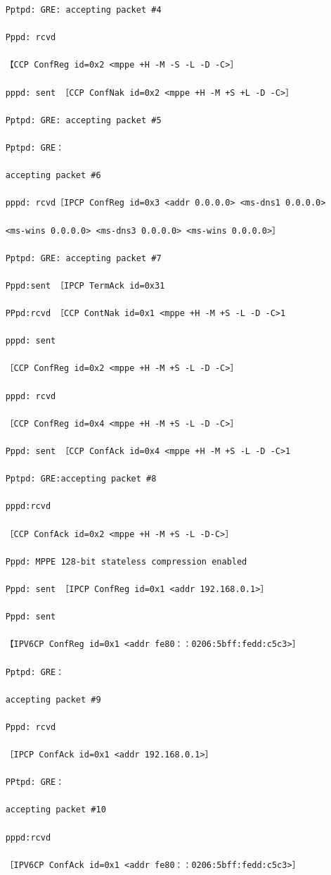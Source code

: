 \begin{verbatim}
    Pptpd: GRE: accepting packet #4
    
    Pppd: rcvd
    
    【CCP ConfReg id=0x2 <mppe +H -M -S -L -D -C>］
    
    pppd: sent ［CCP ConfNak id=0x2 <mppe +H -M +S +L -D -C>］
    
    Pptpd: GRE: accepting packet #5
    
    Pptpd: GRE：
    
    accepting packet #6
    
    pppd: rcvd［IPCP ConfReg id=0x3 <addr 0.0.0.0> <ms-dns1 0.0.0.0>
    
    <ms-wins 0.0.0.0> <ms-dns3 0.0.0.0> <ms-wins 0.0.0.0>］
    
    Pptpd: GRE: accepting packet #7
    
    Pppd:sent ［IPCP TermAck id=0x31
    
    PPpd:rcvd ［CCP ContNak id=0x1 <mppe +H -M +S -L -D -C>1
    
    pppd: sent
    
    ［CCP ConfReg id=0x2 <mppe +H -M +S -L -D -C>］
    
    pppd: rcvd
    
    ［CCP ConfReg id=0x4 <mppe +H -M +S -L -D -C>］
    
    Pppd: sent ［CCP ConfAck id=0x4 <mppe +H -M +S -L -D -C>1
    
    Pptpd: GRE:accepting packet #8
    
    pppd:rcvd
    
    ［CCP ConfAck id=0x2 <mppe +H -M +S -L -D-C>］
    
    Pppd: MPPE 128-bit stateless compression enabled
    
    Pppd: sent ［IPCP ConfReg id=0x1 <addr 192.168.0.1>］
    
    Pppd: sent
    
    【IPV6CP ConfReg id=0x1 <addr fe80：：0206:5bff:fedd:c5c3>］
    
    Pptpd: GRE：
    
    accepting packet #9
    
    Pppd: rcvd
    
    ［IPCP ConfAck id=0x1 <addr 192.168.0.1>］
    
    PPtpd: GRE：
    
    accepting packet #10
    
    pppd:rcvd
    
    ［IPV6CP ConfAck id=0x1 <addr fe80：：0206:5bff:fedd:c5c3>］
    

\end{verbatim}
